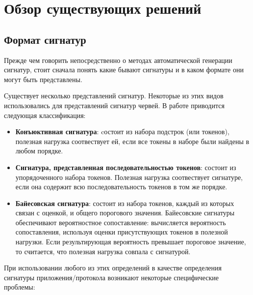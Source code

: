 \section{Обзор существующих решений}
\label{sec:Section2} 

\subsection{Формат сигнатур}

Прежде чем говорить непосредственно о методах автоматической генерации сигнатур, стоит сначала понять какие бывают сигнатуры и в каком формате они могут быть представлены.

Существует несколько представлений сигнатур. Некоторые из этих видов использовались для представлений сигнатур червей.
В работе \cite{newsome2005polygraph} приводится следующая классификация:

\begin{itemize}
    \item \textbf{Конъюктивная сигнатура}: cостоит из набора подстрок (или токенов), полезная нагрузка соотвествует ей, если все токены в наборе были найдены в любом порядке.
    \item \textbf{Сигнатура, представленная последовательностью токенов}: состоит из упорядоченного набора токенов.
    Полезная нагрузка соотвествует сигнатуре, если она содержит всю последовательность токенов в том же порядке.
    \item \textbf{Байесовская сигнатура}: состоит из набора токенов, каждый из которых связан с оценкой, и общего порогового значения.
    Байесовские сигнатуры обеспечивают вероятностное сопоставление: вычисляется вероятность сопоставления, используя оценки присутствующих токенов в полезной нагрузки.
    Если результирующая вероятность превышает пороговое значение, то считается, что полезная нагрузка совпала с сигнатурой.
\end{itemize}

При использовании любого из этих определений в качестве определения сигнатуры приложения/протокола возникают некоторые специфические проблемы:

